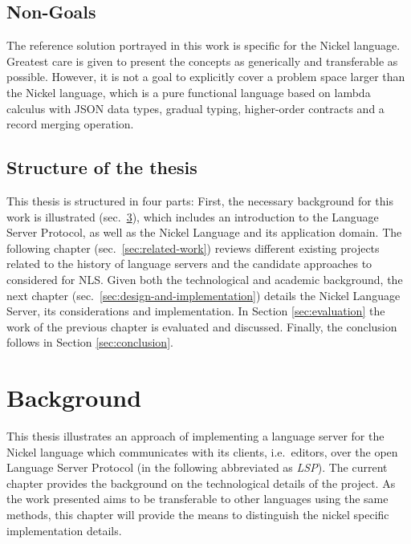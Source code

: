 \documentclass[
  a4paper,
  bibtex,
  english,
  nomenclature]{kthlatex/kththesis/kththesis}
\begin{document}
\hypertarget{sec:non-goals}{%
\section{Non-Goals}\label{sec:non-goals}}

The reference solution portrayed in this work is specific for the Nickel
language. Greatest care is given to present the concepts as generically
and transferable as possible. However, it is not a goal to explicitly
cover a problem space larger than the Nickel language, which is a pure
functional language based on lambda calculus with JSON data types,
gradual typing, higher-order contracts and a record merging operation.

\hypertarget{sec:structure-of-the-thesis}{%
\section{Structure of the thesis}\label{sec:structure-of-the-thesis}}

This thesis is structured in four parts: First, the necessary background
for this work is illustrated (sec.~\ref{sec:background}), which includes
an introduction to the Language Server Protocol, as well as the Nickel
Language and its application domain. The following chapter
(sec.~\ref{sec:related-work}) reviews different existing projects
related to the history of language servers and the candidate approaches
to considered for NLS. Given both the technological and academic
background, the next chapter (sec.~\ref{sec:design-and-implementation})
details the Nickel Language Server, its considerations and
implementation. In Section \ref{sec:evaluation} the work of the previous
chapter is evaluated and discussed. Finally, the conclusion follows in
Section \ref{sec:conclusion}.

\hypertarget{sec:background}{%
\chapter{Background}\label{sec:background}}

This thesis illustrates an approach of implementing a language server
for the Nickel language which communicates with its clients,
i.e.~editors, over the open Language Server Protocol (in the following
abbreviated as \emph{LSP}). The current chapter provides the background
on the technological details of the project. As the work presented aims
to be transferable to other languages using the same methods, this
chapter will provide the means to distinguish the nickel specific
implementation details.
\end{document}
